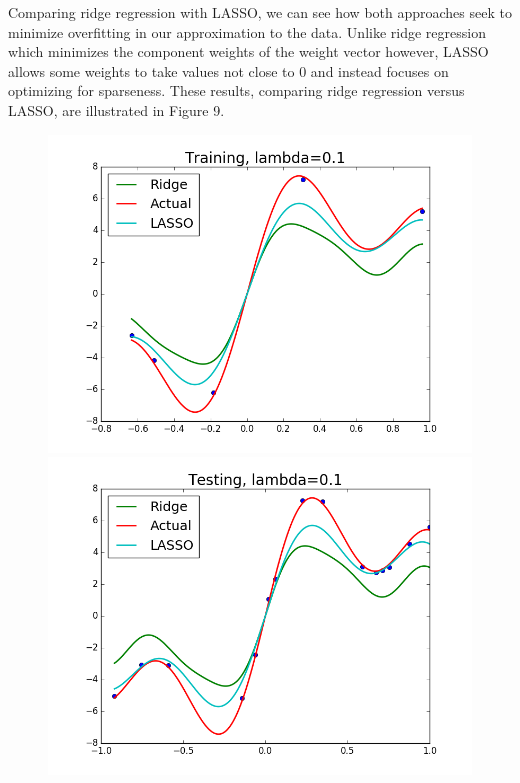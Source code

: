 \documentclass{article}
\begin{document}
Comparing ridge regression with LASSO, we can see how both approaches seek to minimize overfitting in our approximation to the data. Unlike ridge regression which minimizes the component weights of the weight vector however, LASSO allows some weights to take values not close to 0 and instead focuses on optimizing for sparseness. These results, comparing ridge regression versus LASSO, are illustrated in Figure 9.

\begin{figure}[width=\linewidth]
\centering
\begin{multicols}{2}
  \includegraphics[width=1.2\linewidth]{code/P4/training,ridge.png}
  \includegraphics[width=1.2\linewidth]{code/P4/testing,ridge.png}

\end{multicols}
\end{figure}
\end{document}
